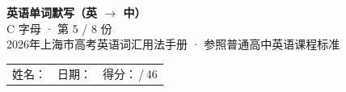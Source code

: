 \documentclass[10pt,a4paper]{article}
\begin{document}
\pagestyle{plain}

\begin{center}
{\LARGE\bfseries 英语单词默写（英 $\to$ 中）}\\[0.22em]
{\large C 字母 · 第 5 / 8 份}\\[0.18em]
{\small 2026年上海市高考英语词汇用法手册 · 参照普通高中英语课程标准}
\end{center}

\vspace{0.25em}
\noindent\begin{tabular}{@{}p{}@{}p{}@{}p{}@{}}
姓名：\underline{\hspace{2.0cm}} & 日期：\underline{\hspace{2.0cm}} & 得分：\underline{\hspace{1.3cm}}\,/\,46 \\
\end{tabular}

\vspace{0.3em}

\vspace{0.08em}
\end{document}
